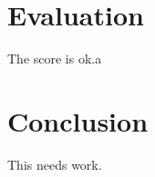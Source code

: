 \documentclass[11pt]{article}
\begin{document}
\section{Evaluation} 
The score is ok.a

\section{Conclusion}
This needs work.



\end{document}
